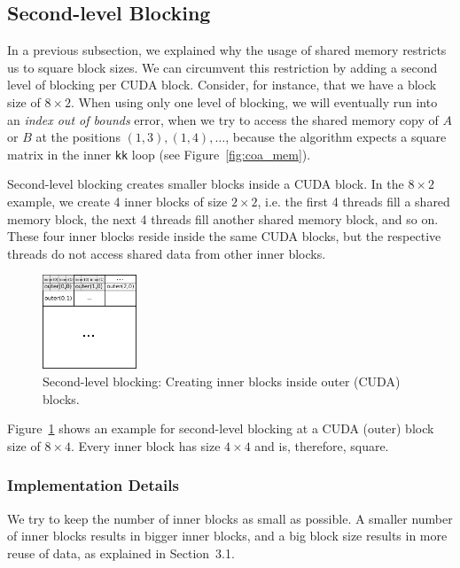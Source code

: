 \documentclass[12pt]{article}
\begin{document}
\subsection{Second-level Blocking}
In a previous subsection, we explained why the usage of shared memory restricts us to square block sizes. We can circumvent this restriction by adding a second level of blocking per CUDA block. Consider, for instance, that we have a block size of $8 \times 2$. When using only one level of blocking, we will eventually run into an \emph{index out of bounds} error, when we try to access the shared memory copy of $A$ or $B$ at the positions $(1,3), (1,4), \ldots$, because the algorithm expects a square matrix in the inner \texttt{kk} loop (see Figure~\ref{fig:coa_mem}).

Second-level blocking creates smaller blocks inside a CUDA block. In the $8 \times 2$ example, we create 4 inner blocks of size $2 \times 2$, i.e. the first 4 threads fill a shared memory block, the next 4 threads fill another shared memory block, and so on. These four inner blocks reside inside the same CUDA blocks, but the respective threads do not access shared data from other inner blocks.

\begin{figure}[H]
\centering
\includegraphics[width=0.25\textwidth]{inner_outer.pdf}
\caption{Second-level blocking: Creating inner blocks inside outer (CUDA) blocks.}
\label{fig:inner_outer}
\end{figure}

Figure~\ref{fig:inner_outer} shows an example for second-level blocking at a CUDA (outer) block size of $8 \times 4$. Every inner block has size $4 \times 4$ and is, therefore, square.

\subsubsection{Implementation Details}
We try to keep the number of inner blocks as small as possible. A smaller number of inner blocks results in bigger inner blocks, and a big block size results in more reuse of data, as explained in Section~3.1. 
\end{document}
